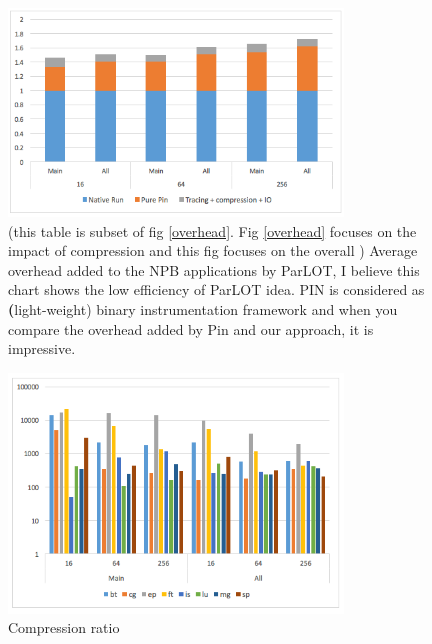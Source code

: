 \begin{figure}[!t]
\centering
\includegraphics[width=3.5in]{figs.stampede/overhead2.png}
\caption{
(this table is subset of fig \ref{overhead}. Fig \ref{overhead} focuses on the impact of compression and this fig focuses on the overall )
Average overhead added to the NPB applications by ParLOT, I believe this chart shows the low efficiency of ParLOT idea. PIN is considered as \textbf(light-weight) binary instrumentation framework and when you compare the overhead added by Pin and our approach, it is impressive.}
\label{overhead2}
\end{figure}


\begin{table}[]
\centering
\label{t_compRatio}

\end{table}


\begin{figure}[!t]
\centering
\includegraphics[width=3.5in]{figs.stampede/compRatio.png}
\caption{Compression ratio}
\label{compRatio}
\end{figure}